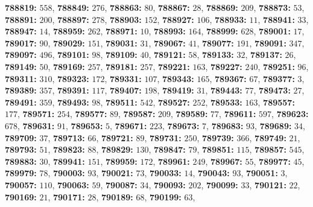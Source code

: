 \textsf{\bfseries 788819:} $558$, \textsf{\bfseries 788849:} $276$, \textsf{\bfseries 788863:} $80$, \textsf{\bfseries 788867:} $28$, \textsf{\bfseries 788869:} $209$, \textsf{\bfseries 788873:} $53$, \textsf{\bfseries 788891:} $200$, \textsf{\bfseries 788897:} $278$, \textsf{\bfseries 788903:} $152$, \textsf{\bfseries 788927:} $106$, \textsf{\bfseries 788933:} $11$, \textsf{\bfseries 788941:} $33$, \textsf{\bfseries 788947:} $14$, \textsf{\bfseries 788959:} $262$, \textsf{\bfseries 788971:} $10$, \textsf{\bfseries 788993:} $164$, \textsf{\bfseries 788999:} $628$, \textsf{\bfseries 789001:} $17$, \textsf{\bfseries 789017:} $90$, \textsf{\bfseries 789029:} $151$, \textsf{\bfseries 789031:} $31$, \textsf{\bfseries 789067:} $41$, \textsf{\bfseries 789077:} $191$, \textsf{\bfseries 789091:} $347$, \textsf{\bfseries 789097:} $496$, \textsf{\bfseries 789101:} $98$, \textsf{\bfseries 789109:} $40$, \textsf{\bfseries 789121:} $58$, \textsf{\bfseries 789133:} $32$, \textsf{\bfseries 789137:} $26$, \textsf{\bfseries 789149:} $50$, \textsf{\bfseries 789169:} $257$, \textsf{\bfseries 789181:} $257$, \textsf{\bfseries 789221:} $163$, \textsf{\bfseries 789227:} $240$, \textsf{\bfseries 789251:} $96$, \textsf{\bfseries 789311:} $310$, \textsf{\bfseries 789323:} $172$, \textsf{\bfseries 789331:} $107$, \textsf{\bfseries 789343:} $165$, \textsf{\bfseries 789367:} $67$, \textsf{\bfseries 789377:} $3$, \textsf{\bfseries 789389:} $357$, \textsf{\bfseries 789391:} $117$, \textsf{\bfseries 789407:} $198$, \textsf{\bfseries 789419:} $31$, \textsf{\bfseries 789443:} $77$, \textsf{\bfseries 789473:} $27$, \textsf{\bfseries 789491:} $359$, \textsf{\bfseries 789493:} $98$, \textsf{\bfseries 789511:} $542$, \textsf{\bfseries 789527:} $252$, \textsf{\bfseries 789533:} $163$, \textsf{\bfseries 789557:} $177$, \textsf{\bfseries 789571:} $254$, \textsf{\bfseries 789577:} $89$, \textsf{\bfseries 789587:} $209$, \textsf{\bfseries 789589:} $77$, \textsf{\bfseries 789611:} $597$, \textsf{\bfseries 789623:} $678$, \textsf{\bfseries 789631:} $91$, \textsf{\bfseries 789653:} $5$, \textsf{\bfseries 789671:} $223$, \textsf{\bfseries 789673:} $7$, \textsf{\bfseries 789683:} $93$, \textsf{\bfseries 789689:} $34$, \textsf{\bfseries 789709:} $37$, \textsf{\bfseries 789713:} $66$, \textsf{\bfseries 789721:} $89$, \textsf{\bfseries 789731:} $250$, \textsf{\bfseries 789739:} $366$, \textsf{\bfseries 789749:} $21$, \textsf{\bfseries 789793:} $51$, \textsf{\bfseries 789823:} $88$, \textsf{\bfseries 789829:} $130$, \textsf{\bfseries 789847:} $79$, \textsf{\bfseries 789851:} $115$, \textsf{\bfseries 789857:} $545$, \textsf{\bfseries 789883:} $30$, \textsf{\bfseries 789941:} $151$, \textsf{\bfseries 789959:} $172$, \textsf{\bfseries 789961:} $249$, \textsf{\bfseries 789967:} $55$, \textsf{\bfseries 789977:} $45$, \textsf{\bfseries 789979:} $78$, \textsf{\bfseries 790003:} $93$, \textsf{\bfseries 790021:} $73$, \textsf{\bfseries 790033:} $14$, \textsf{\bfseries 790043:} $93$, \textsf{\bfseries 790051:} $3$, \textsf{\bfseries 790057:} $110$, \textsf{\bfseries 790063:} $59$, \textsf{\bfseries 790087:} $34$, \textsf{\bfseries 790093:} $202$, \textsf{\bfseries 790099:} $33$, \textsf{\bfseries 790121:} $22$, \textsf{\bfseries 790169:} $21$, \textsf{\bfseries 790171:} $28$, \textsf{\bfseries 790189:} $68$, \textsf{\bfseries 790199:} $63$, 
